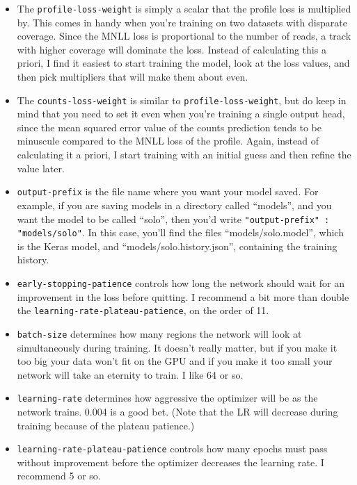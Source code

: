 \documentclass{article}
\begin{document}
\begin{itemize}
    \item The \texttt{profile-loss-weight} is simply a scalar that the profile loss is multiplied by. This comes in handy when you're training on two datasets with disparate coverage. Since the MNLL loss is proportional to the number of reads, a track with higher coverage will dominate the loss. Instead of calculating this a priori, I find it easiest to start training the model, look at the loss values, and then pick multipliers that will make them about even. 
    \item The \texttt{counts-loss-weight} is similar to \texttt{profile-loss-weight}, but do keep in mind that you need to set it even when you're training a single output head, since the mean squared error value of the counts prediction tends to be minuscule compared to the MNLL loss of the profile. Again, instead of calculating it a priori, I start training with an initial guess and then refine the value later. 
    \item \texttt{output-prefix} is the file name where you want your model saved. For example, if you are saving models in a directory called ``models'', and you want the model to be called ``solo'', then you'd write \texttt{"output-prefix" : "models/solo"}. In this case, you'll find the files ``models/solo.model'', which is the Keras model, and ``models/solo.history.json'', containing the training history. 
    \item \texttt{early-stopping-patience} controls how long the network should wait for an improvement in the loss before quitting. I recommend a bit more than double the \texttt{learning-rate-plateau-patience}, on the order of 11. 
    \item \texttt{batch-size} determines how many regions the network will look at simultaneously during training. It doesn't really matter, but if you make it too big your data won't fit on the GPU and if you make it too small your network will take an eternity to train. I like 64 or so. 
    \item \texttt{learning-rate} determines how aggressive the optimizer will be as the network trains. 0.004 is a good bet. (Note that the LR will decrease during training because of the plateau patience.)
    \item \texttt{learning-rate-plateau-patience} controls how many epochs must pass without improvement before the optimizer decreases the learning rate. I recommend 5 or so. 


\end{itemize}
\end{document}
